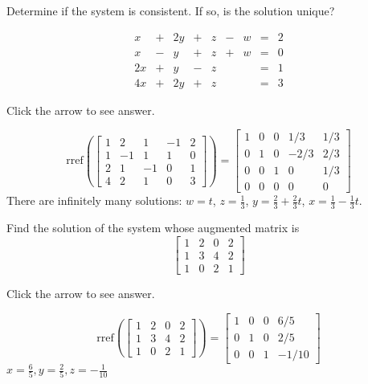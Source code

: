 \documentclass{ximera}
\begin{document}
\begin{problem}\label{prb:2.16}
Determine if the system is consistent. If so, is the solution unique?

$$\begin{array}{ccccccccc}
      x & +&2y&+&z&-&w&= &2 \\
	 x& -&y&+&z&+&w&=&0\\
     2x& +&y&-&z&&&=&1\\
     4x&+&2y&+&z&&&=&3
    \end{array}$$

Click the arrow to see answer. 
\begin{expandable}
$$\text{rref}\left(\left[
\begin{array}{rrrr|r}
1 & 2 & 1 & -1 & 2 \\
1 & -1 & 1 & 1 & 0 \\
2 & 1 & -1 & 0 & 1 \\
4 & 2 & 1 & 0 & 3
\end{array}
\right]\right)=\left[
\begin{array}{rrrr|r}
1 & 0 & 0 & 1/3 & 1/3 \\
0 & 1 & 0 & -2/3 & 2/3 \\
0 & 0 & 1 & 0 & 1/3 \\
0 & 0 & 0 & 0 & 0
\end{array}
\right] $$
There are infinitely many solutions: $w=t$, $z=\frac{1}{3}$, $y=\frac{2}{3}+\frac{2}{3}t$, $x=\frac{1}{3}-\frac{1}{3}t$.
\end{expandable}
\end{problem}

\begin{problem}\label{prb:2.25} Find the solution of the system whose augmented matrix is
\begin{equation*}
\left[
\begin{array}{rrr|r}
1 & 2 & 0 & 2 \\
1 & 3 & 4 & 2 \\
1 & 0 & 2 & 1
\end{array}
\right]
\end{equation*}

Click the arrow to see answer. 
\begin{expandable}

$$\text{rref}\left(\left[
\begin{array}{rrr|r}
1 & 2 & 0 & 2 \\
1 & 3 & 4 & 2 \\
1 & 0 & 2 & 1
\end{array}
\right]\right)=\left[
\begin{array}{rrr|r}
1 & 0 & 0 & 6/5 \\
0 & 1 & 0 & 2/5 \\
0 & 0 & 1 & -1/10
\end{array}
\right]$$
$x=\frac{6}{5}, y=\frac{2}{5}, z=-\frac{1}{10}$
\end{expandable}
\end{problem}
\end{document}
